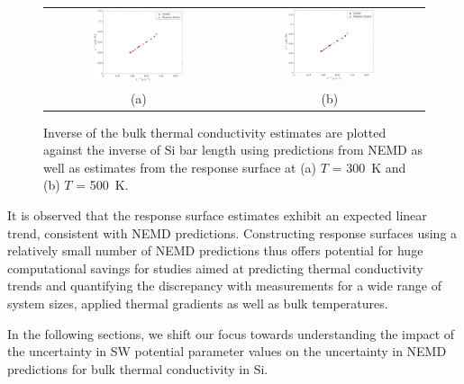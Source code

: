 \begin{figure}[htbp]
\begin{center}
\begin{tabular}{cc}
 \hspace{-10mm}
  \includegraphics[width=0.50\textwidth]{./Figures/kinv_300}
  &
  \includegraphics[width=0.50\textwidth]{./Figures/kinv_500}
  \\ (a) & (b)
  \end{tabular}
 \caption{Inverse of the bulk thermal conductivity estimates are plotted against the inverse of Si bar length
 using predictions from NEMD as well as estimates from the response surface at (a)  $T$ = 300~K and 
 (b) $T$ = 500~K.}
\label{fig:kinv}
\end{center}
\end{figure}

It is observed that the response surface estimates exhibit an expected linear trend, consistent with NEMD
  predictions. Constructing response surfaces using a relatively small number of NEMD predictions thus offers
  potential for huge computational savings for studies aimed at predicting thermal conductivity trends and 
  quantifying the discrepancy with measurements for a wide range of system sizes, applied thermal gradients as 
  well as bulk temperatures.

In the following sections, we shift our focus towards understanding the impact of the uncertainty
in SW potential parameter values on the uncertainty in NEMD predictions for bulk
thermal conductivity in Si.  
 




































